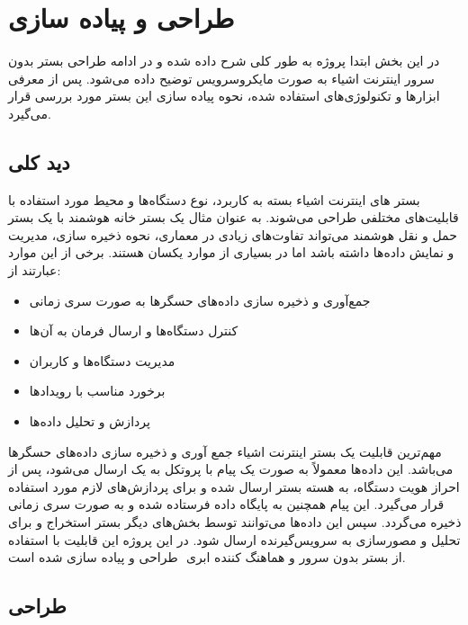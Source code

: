 \chapter{طراحی و پیاده سازی}\label{chapter3}

در این بخش ابتدا پروژه به طور کلی شرح داده شده و در ادامه طراحی بستر بدون سرور اینترنت اشیاء به صورت مایکروسرویس توضیح داده می‌شود. پس از معرفی ابزارها و تکنولوژی‌های استفاده شده، نحوه پیاده سازی این بستر مورد بررسی قرار می‌گیرد.

\section{دید کلی}

بستر های اینترنت اشیاء بسته به کاربرد، نوع دستگاه‌ها و محیط مورد استفاده با قابلیت‌های مختلفی طراحی می‌شوند. به عنوان مثال یک بستر خانه هوشمند با یک بستر حمل و نقل هوشمند می‌تواند تفاوت‌های زیادی در معماری، نحوه ذخیره سازی، مدیریت و نمایش داده‌ها داشته باشد اما در بسیاری از موارد یکسان هستند. برخی از این موارد عبارتند از:
\begin{itemize}
	
	\item جمع‌‌آوری و ذخیره سازی داده‌های حسگر‌ها به صورت سری زمانی
	
	\item کنترل دستگاه‌ها و ارسال فرمان به آن‌ها
	
	\item مدیریت دستگاه‌ها و کاربران
	
	\item برخورد مناسب با رویداد‌ها
	
	\item پردازش و تحلیل داده‌ها
	
\end{itemize}

مهم‌ترین قابلیت یک بستر اینترنت اشیاء جمع آوری و ذخیره سازی داده‌های حسگر‌ها می‌باشد. این داده‌ها معمولاً به صورت یک پیام با پروتکل  به یک  ارسال می‌شود، پس از احراز هویت دستگاه، به هسته بستر ارسال شده و برای پردازش‌های لازم مورد استفاده قرار می‌گیرد. این پیام همچنین به پایگاه داده فرستاده شده و به صورت سری زمانی ذخیره می‌گردد. سپس این داده‌ها می‌توانند توسط بخش‌های دیگر بستر استخراج و برای تحلیل و مصورسازی به سرویس‌گیرنده ارسال شود. در این پروژه این قابلیت با استفاده از بستر بدون سرور  و هماهنگ کننده ابری ‌ طراحی و پیاده سازی شده است.

\newpage

\section{طراحی}

